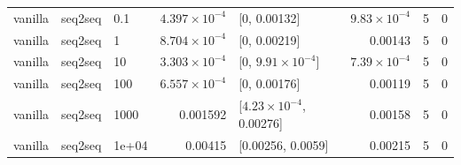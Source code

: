 \documentclass[10pt]{article}
\begin{document}
{\begin{longtable}{lllrlrrr}
vanilla & seq2seq & 0.1 & $4.397\times10^{-4}$ & [0, 0.00132] & $9.83\times10^{-4}$ & 5 & 0\\
vanilla & seq2seq & 1 & $8.704\times10^{-4}$ & [0, 0.00219] & 0.00143 & 5 & 0\\
vanilla & seq2seq & 10 & $3.303\times10^{-4}$ & [0, $9.91\times10^{-4}$] & $7.39\times10^{-4}$ & 5 & 0\\
vanilla & seq2seq & 100 & $6.557\times10^{-4}$ & [0, 0.00176] & 0.00119 & 5 & 0\\
vanilla & seq2seq & 1000 & 0.001592 & [$4.23\times10^{-4}$, 0.00276] & 0.00158 & 5 & 0\\
vanilla & seq2seq & 1e+04 & 0.00415 & [0.00256, 0.0059] & 0.00215 & 5 & 0\\
\bottomrule
\end{longtable}
}
\end{document}
